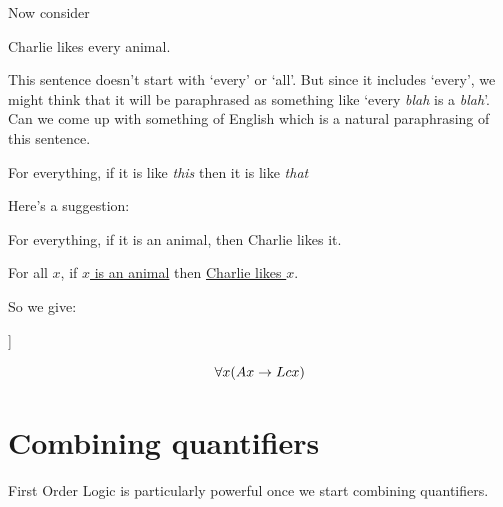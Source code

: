 Now consider
\begin{samplesent}
	\item Charlie likes every animal.
\end{samplesent}
This sentence doesn't start with `every' or `all'. But since it includes `every', we might think that it will be paraphrased as something like `every \emph{blah} is a \emph{blah}'. Can we come up with something of English which is a natural paraphrasing of this sentence. 
\begin{samplesent}
	\item[] For everything, if it is like \emph{this} then it is like \emph{that}
\end{samplesent}
Here's a suggestion: 
\begin{samplesent}
	\item[] For everything, if it is an animal, then Charlie likes it.
	\item[] For all $x$, if \underline{$x$ is an animal} then \underline{Charlie likes $x$}. 
\end{samplesent}
So we give:
\begin{center}
	\begin{forest}
		[Charlie likes every animal.\\
		For all $x$:  if \ldots then \ldots\\
		$\forall x(\ldots\eif \ldots)$
		[$x$ is an animal\\$Ax$]
		[Charlie likes $x$\\$Lcx$]
		]
	\end{forest}
\end{center}
$$\forall x(Ax\rightarrow Lcx)$$

\section{Combining quantifiers}



First Order Logic is particularly powerful once we start combining quantifiers. 

